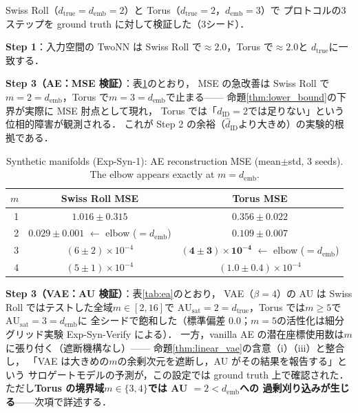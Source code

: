 \documentclass[11pt,a4paper]{jsarticle}
\newcommand{\dID}{d_{\mathrm{ID}}}
\newcommand{\hatdID}{\hat{d}_{\mathrm{ID}}}
\newcommand{\dtrue}{d_{\mathrm{true}}}
\newcommand{\AUsat}{\mathrm{AU}_{\mathrm{sat}}}
\newcommand{\demb}{d_{\mathrm{emb}}}
\begin{document}
Swiss Roll（$\dtrue = \demb = 2$）と Torus（$\dtrue = 2$，$\demb = 3$）で
プロトコルの3ステップを ground truth に対して検証した（3シード）．

\textbf{Step 1}：入力空間の TwoNN は Swiss Roll で$\approx 2.0$，Torus で$\approx 2.0$と
$\dtrue$に一致する．

\textbf{Step 3（AE：MSE 検証）}：表\ref{tab:e1}のとおり，
MSE の急改善は Swiss Roll で$m = 2 = \demb$，Torus で$m = 3 = \demb$で止まる——
命題\ref{thm:lower_bound}の下界が実際に MSE 肘点として現れ，
Torus では「$\dID = 2$では足りない」という位相的障害が観測される．
これが Step 2 の余裕（$\hatdID$より大きめ）の実験的根拠である．

\begin{table}[H]
\centering
\caption{Synthetic manifolds (Exp-Syn-1): AE reconstruction MSE
(mean$\pm$std, 3 seeds). The elbow appears exactly at $m = \demb$.}
\label{tab:e1}
\small
\begin{tabular}{rcc}
\toprule
$m$ & Swiss Roll MSE & Torus MSE \\
\midrule
1 & $1.016 \pm 0.315$ & $0.356 \pm 0.022$ \\
2 & $\boldsymbol{0.029 \pm 0.001}$ $\leftarrow$ elbow ($= \demb$) & $0.109 \pm 0.007$ \\
3 & $(6 \pm 2) \times 10^{-4}$ & $\boldsymbol{(4 \pm 3) \times 10^{-4}}$ $\leftarrow$ elbow ($= \demb$) \\
4 & $(5 \pm 1) \times 10^{-4}$ & $(1.0 \pm 0.4) \times 10^{-4}$ \\
\bottomrule
\end{tabular}
\end{table}

\textbf{Step 3（VAE：AU 検証）}：表\ref{tab:ea}のとおり，
VAE（$\beta = 4$）の AU は Swiss Roll ではテストした全域$m \in [2, 16]$で
$\AUsat = 2 = \dtrue$，Torus では$m \geq 5$で$\AUsat = 3 = \demb$に
全シードで飽和した（標準偏差 0.0；$m = 5$の活性化は細分グリッド実験
Exp-Syn-Verify による）．
一方，vanilla AE の潜在座標使用数は$m$に張り付く（遮断機構なし）——
命題\ref{thm:linear_vae}の含意（i）（iii）と整合し，
「VAE は大きめの$m$の余剰次元を遮断し，AU がその結果を報告する」という
サロゲートモデルの予測が，この設定では ground truth 上で確認された．
ただし\textbf{Torus の境界域$m \in \{3, 4\}$では AU $= 2 < \demb$への
過剰刈り込みが生じる}——次項で詳述する．
\end{document}
